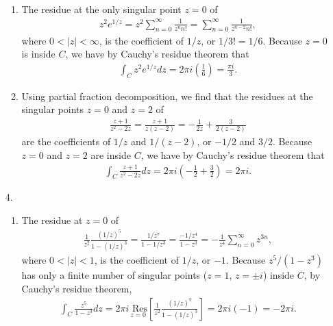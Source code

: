 \documentclass[a4paper,12pt]{article}
\begin{document}
\begin{enumerate}
\begin{enumerate}
            \item
                The residue at the only singular point $z = 0$ of
                \begin{align*}
                    z^2 e^{1/z} = z^2 \sum_{n = 0}^\infty \frac{1}{z^n n!} = \sum_{n = 0}^\infty \frac{1}{z^{n - 2} n!},
                \end{align*}
                where $0 < |z| < \infty$, is the coefficient of $1/z$, or $1/3! = 1/6$. Because $z = 0$ is inside $C$, we have by Cauchy's residue theorem that
                \begin{align*}
                    \int_C z^2 e^{1/z} dz = 2\pi i \left( \frac{1}{6} \right) = \frac{\pi i}{3}.
                \end{align*}

            \item
                Using partial fraction decomposition, we find that the residues at the singular points $z = 0$ and $z = 2$ of
                \begin{align*}
                    \frac{z + 1}{z^2 - 2z} = \frac{z + 1}{z(z - 2)} = -\frac{1}{2z} + \frac{3}{2(z - 2)}
                \end{align*}
                are the coefficients of $1/z$ and $1/(z - 2)$, or $-1/2$ and $3/2$. Because $z = 0$ and $z = 2$ are inside $C$, we have by Cauchy's residue theorem that
                \begin{align*}
                    \int_C \frac{z + 1}{z^2 - 2z} dz = 2\pi i \left( -\frac{1}{2} + \frac{3}{2} \right) = 2\pi i.
                \end{align*}
        \end{enumerate}

    \item[4.]
        \begin{enumerate}
            \item
                The residue at $z = 0$ of
                \begin{align*}
                    \frac{1}{z^2} \frac{(1/z)^5}{1 - (1/z)^3} = \frac{1/z^7}{1 - 1/z^3} = \frac{-1/z^4}{1 - z^3} = -\frac{1}{z^4} \sum_{n = 0}^\infty z^{3n},
                \end{align*}
                where $0 < |z| < 1$, is the coefficient of $1/z$, or $-1$. Because $z^5/(1 - z^3)$ has only a finite number of singular points ($z = 1$, $z = \pm i$) inside $C$, by Cauchy's residue theorem,
                \begin{align*}
                    \int_C \frac{z^5}{1 - z^3} dz = 2\pi i \underset{z = 0}{\text{\ Res}} \left[ \frac{1}{z^2} \frac{(1/z)^5}{1 - (1/z)^3} \right] = 2\pi i(-1) = -2\pi i.
                \end{align*}


\end{enumerate}
\end{enumerate}
\end{document}
